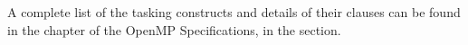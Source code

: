 A complete list of the tasking constructs and details of their clauses
can be found in the  chapter of the OpenMP Specifications,
in the  section.












